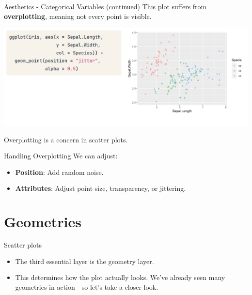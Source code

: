 \documentclass[
  ignorenonframetext,
]{beamer}
\begin{document}
\begin{frame}{Aesthetics - Categorical Variables (continued)}
\label{aesthetics---categorical-variables-continued}
This plot suffers from \textbf{overplotting}, meaning not every point is
visible.

\includegraphics{../images/im182.png}

Overplotting is a concern in scatter plots.
\end{frame}

\begin{frame}{Handling Overplotting}
\label{handling-overplotting}
We can adjust:

\begin{itemize}
\item
  \textbf{Position}: Add random noise.
\item
  \textbf{Attributes}: Adjust point size, transparency, or jittering.
\end{itemize}
\end{frame}

\section{Geometries}\label{geometries-1}

\begin{frame}{Scatter plots}
\label{scatter-plots}
\begin{itemize}
\item
  The third essential layer is the geometry layer.
\item
  This determines how the plot actually looks. We've already seen many
  geometries in action - so let's take a closer look.
\end{itemize}
\end{frame}
\end{document}

